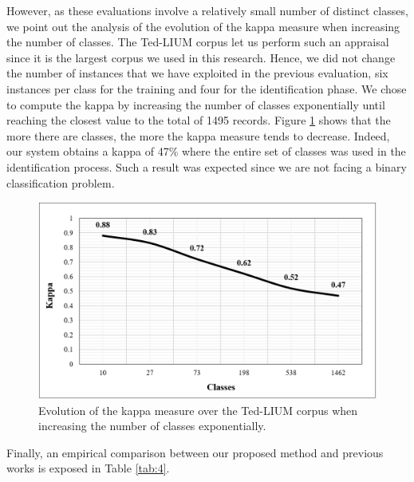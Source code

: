 \documentclass[cryptography,article,submit,moreauthors,pdftex,10pt,a4paper]{mdpi}
\begin{document}
However, as these evaluations involve a relatively small number of distinct classes, we point out the analysis of the evolution of the kappa measure when increasing the number of classes. The Ted-LIUM corpus let us perform such an appraisal since it is the largest corpus we used in this research. Hence, we did not change the number of instances that we have exploited in the previous evaluation, six instances per class for the training and four for the identification phase. We chose to compute the kappa by increasing the number of classes exponentially until reaching the closest value to the total of 1495 records. Figure \ref{fig:10} shows that the more there are classes, the more the kappa measure tends to decrease. Indeed, our system obtains a kappa of 47\% where the entire set of classes was used in the identification process. Such a result was expected since we are not facing a binary classification problem.

\begin{figure}[H]
	\centering
	\includegraphics[width=10 cm]{10.png}
	\caption{Evolution of the kappa measure over the Ted-LIUM corpus when increasing the number of classes exponentially.}
	\label{fig:10}
\end{figure}

Finally, an empirical comparison between our proposed method and previous works is exposed in Table \ref{tab:4}.
\end{document}
